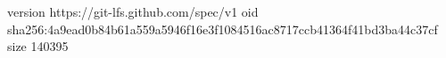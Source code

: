 version https://git-lfs.github.com/spec/v1
oid sha256:4a9ead0b84b61a559a5946f16e3f1084516ac8717ccb41364f41bd3ba44c37cf
size 140395
